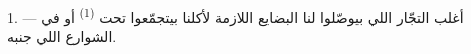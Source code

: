 %
%
%
%
%
%
%
%
%

\VUsaut{4.0mm}
\VUsaut{3.0mm}

\VUsaut{3.0mm}

1. --- أغلب التجّار اللي بيوصّلوا لنا البضايع اللازمة لأكلنا بيتجمّعوا تحت
 \textsuperscript{(1)}  أو في الشوارع اللي جنبه.

